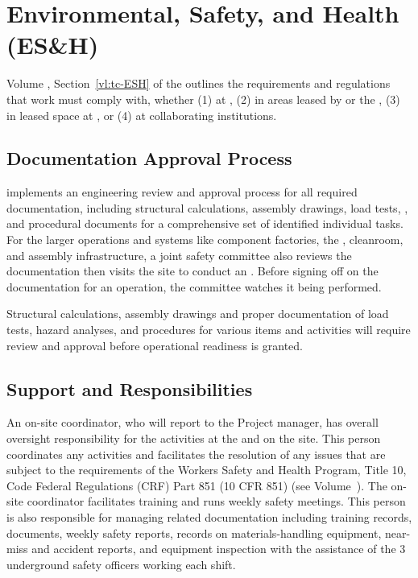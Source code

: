 \section{Environmental, Safety, and Health (ES\&H)}
\label{sec:fdsp-tc-safety}

 Volume \volnumbertc{}, Section~\ref{vl:tc-ESH} of the   outlines the requirements and regulations that  work must comply with, whether (1) at , (2) in areas  leased by  or the , (3) in leased space at , or (4) at collaborating institutions.
 
\subsection{Documentation Approval Process}


 implements an engineering review and approval process for all required documentation, including structural calculations, assembly drawings, load tests, , and procedural documents for a comprehensive set of identified individual tasks.  For the larger operations and systems like  component factories, the , cleanroom, and assembly infrastructure, a joint safety committee also reviews the documentation then visits the site to conduct
 an . Before signing off on the documentation for an operation, the committee watches it being performed. 
 
 Structural calculations, assembly drawings and proper documentation of  load tests, hazard analyses, and procedures for various items and activities will require review and approval before operational readiness is granted. 

 
\subsection{Support and Responsibilities}

An on-site  coordinator, who will report to the  Project  manager, has overall  oversight responsibility for the  activities at the   and on the  site. 
This person coordinates any  activities and facilitates the resolution of any issues that are subject to the requirements of the  Workers Safety and Health Program, Title 10, Code Federal Regulations (CRF) Part 851 (10 CFR 851) (see Volume~\volnumbertc{}).  The on-site  coordinator facilitates training and runs weekly safety meetings. This  person is also responsible for managing  related  documentation including training records,  documents, weekly safety reports, records on materials-handling equipment, near-miss and accident reports, and equipment inspection with the assistance of the 3 underground safety officers working each shift. 


